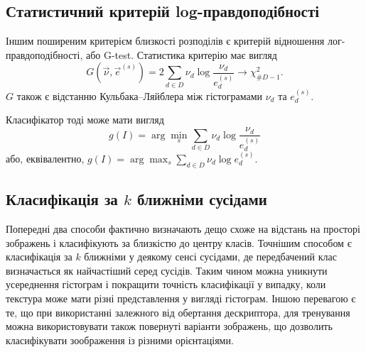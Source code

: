 \subsection{Статистичний критерій log-правдоподібності}\label{section1.3b}\hfill

Іншим поширеним критерієм близкості розподілів є критерій відношення лог-правдоподібності, або G-test.
Статистика критерію має вигляд%
\begin{equation*}\label{e:gtest-1}
    G(\vec \nu,\vec e^{(s)}) = 2\sum_{d \in D} \nu_d \log \frac{\nu_d}{e^{(s)}_d} \longrightarrow \chi^2_{\# D - 1}.
\end{equation*}
$G$ також є відстанню Кульбака--Ляйблера між гістограмами $\nu_d$ та $e^{(s)}_d$. 


Класифікатор тоді може мати вигляд
\begin{equation}\label{e:gtest-classifier-1}
    g(I) = \arg \min_s  \sum_{d \in D} \nu_d \log \frac{\nu_d}{e^{(s)}_d}
\end{equation}
або, еквівалентно, 
$g(I) = \arg \max_s  \sum_{d \in D} \nu_d \log e^{(s)}_d.$

\subsection{Класифікація за $k$ ближніми сусідами}\label{section1.3c}\hfill

Попередні два способи фактично визначають дещо схоже на відстань на просторі зображень і класифікують за близкістю до центру класів.
Точнішим способом є класифікація за $k$ ближніми у деякому сенсі сусідами, де передбачений клас визначається як найчастіший серед сусідів.
Таким чином можна уникнути усереднення гістограм і покращити точність класифікації у випадку, коли текстура може мати різні представлення у вигляді гістограм.
Іншою перевагою є те, що при використанні залежного від обертання дескриптора, для тренування можна використовувати також повернуті варіанти зображень, що дозволить класифікувати зоображення із різними орієнтаціями.



